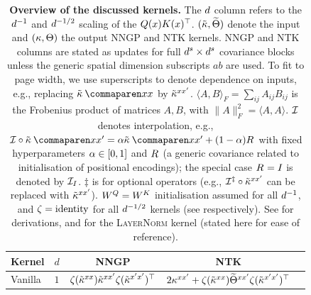 \documentclass{article}
\begin{document}
\begin{table}[t]
\caption{
\textbf{Overview of the discussed kernels.}
The $d$ column refers to the $d^{-1}$ and $d^{-1/2}$ scaling of the $Q (x) K(x)^\top$.
$(\tilde{\kappa}, \widetilde{\Theta})$ denote the input and $(\kappa, \Theta)$ the output NNGP and NTK kernels.
\textsc{NNGP} and \textsc{NTK} columns are stated as updates for full $d^s \times d^s$ covariance blocks unless the generic spatial dimension subscripts $a b$ are used.
To fit to page width, we use superscripts to denote dependence on inputs, e.g., replacing $\kerntildef{}{}{\inputSymbol}{\inputSymbol}$ by $\tilde{\kappa}^{xx'}$.
$\langle A, B \rangle_F = \sum_{ij} A_{ij} B_{ij}$ is the Frobenius product of matrices $A, B$, with $\| A \|_F^2 = \langle A, A \rangle$.
$\mathcal{I}$ denotes interpolation,
e.g.,
$\interpKern \circ \kerntildef{}{}{\inputSymbol}{\inputSymbol'} = \interpKernCoeff \kerntildef{}{}{\inputSymbol}{\inputSymbol'} + (1 - \interpKernCoeff) \covPosEmb{}{}$ with fixed hyperparameters $\alpha \in [0, 1]$ and $R_{}^{}$ (a generic covariance related to initialisation of positional encodings);
the special case $R_{}^{} = I$ is denoted by $\mathcal{I}_{I}$.
$\ddag$ is for optional operators (e.g., $\mathcal{I}^\ddag \circ  \tilde{\kappa}^{xx'}$ can be replaced with $\tilde{\kappa}^{xx'}$).
$W^{Q} = W^{K}$ initialisation assumed for all $d^{-1}$, and $\zeta = \text{identity}$ for all $d^{-1/2}$ kernels (see  respectively).
See  for derivations, and \citep{yang2019v2} for the \textsc{LayerNorm} kernel (stated here for ease of reference).
}
\label{tab:kernel_overview}
\begin{center}
\fontsize{\tableFS}{1.2\tableFS}
\begin{sc}
\renewcommand{\arraystretch}{1.75}
\begin{tabular}{lcccc}
    \toprule
    Kernel & $d$ &  NNGP & NTK  \\
    \midrule
    \multirow{2}{*}{Vanilla}    &
    $1$
    &
    $
    \zeta(
        \tilde{\kappa}^{xx}
    )
        \tilde{\kappa}^{xx'}
    \zeta(
        \tilde{\kappa}^{x'x'}
    )^\top
    $ 
    &
    $
    2 
    \kappa^{xx'}
    +
    \zeta(
        \tilde{\kappa}^{xx}
    )
        \widetilde{\Theta}^{xx'}
    \zeta(
        \tilde{\kappa}^{x'x'}
    )^\top
    $ 
    \\
    

\end{tabular}
\end{sc}
\end{center}
\end{table}
\end{document}
